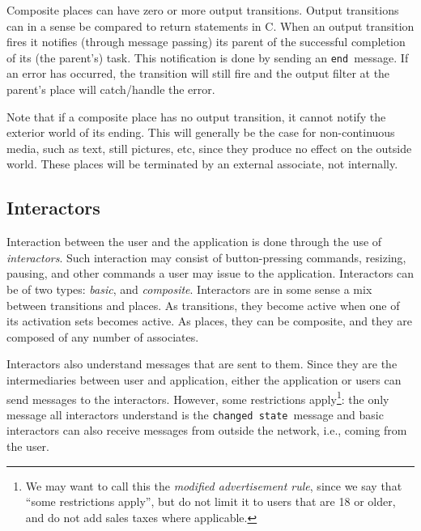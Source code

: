 \documentclass[twocolumn,10pt]{article}
\newcommand{\theEnd}{{\tt end}}
\newcommand{\changedState}{{\tt changed state}}
\newcommand{\theEndRep}{END}
\begin{document}
Composite places can have zero or more output transitions.  Output
transitions can in a sense be compared to return statements in C.
When an output transition fires it notifies (through message passing)
its parent of the successful completion of its (the parent's) task.
This notification is done by sending an \theEnd\ message.  If an error
has occurred, the transition will still fire and the output filter at
the parent's place will catch/handle the error.

Note that if a composite place has no output transition, it cannot
notify the exterior world of its ending.  This will generally be the case
for non-continuous media, such as text, still pictures, etc, since
they produce no effect on the outside world.  These
places will be terminated by an external associate, not internally.



\subsection{Interactors}

Interaction between the user and the application is done through the
use of {\em interactors}.  Such interaction may consist of
button-pressing commands, resizing, pausing, and other commands a user
may issue to the application.  Interactors can be of two types: {\em
  basic}, and {\em composite}.  Interactors are in some sense a mix
between transitions and places.  As transitions, they become active
when one of its activation sets becomes active.  As places, they can
be composite, and they are composed of any number of associates.

Interactors also understand messages that are sent to them.  Since
they are the intermediaries between user and application, either the
application or users can send messages to the interactors.  However, some
restrictions apply\footnote{We may want to call this the {\em modified
advertisement rule}, since we say that ``some restrictions apply'',
but do not limit it to users that are 18 or older, and do not add
sales taxes where applicable.}:  the only
message all interactors understand is the \changedState\  
message and basic interactors can also receive messages from
outside the network, i.e., coming from the user.
\end{document}
